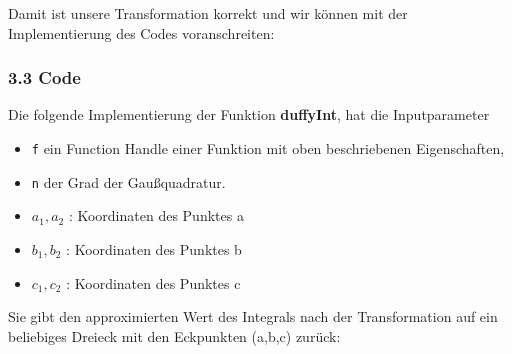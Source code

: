 \documentclass[a4paper,11pt,bibliography=totoc,listof=totoc,headinclude=true,cleardoublepage=empty,oneside]{scrbook}
\newcommand{\code}[1]{\texttt{\color{change}#1}}
\begin{document}
		Damit ist unsere Transformation korrekt und wir können mit der Implementierung des Codes voranschreiten:
	
	\vspace{3mm} 
		
		
			\subsubsection{3.3 Code}
			Die folgende Implementierung der Funktion \textbf{duffyInt}, hat die Inputparameter
			\begin{itemize}
				\item \code{f} ein Function Handle einer Funktion mit oben beschriebenen Eigenschaften,
				\item \code{n} der Grad der Gaußquadratur.
				\item \code{$a_1,a_2$} : Koordinaten des Punktes a
				\item \code{$b_1,b_2$} : Koordinaten des Punktes b
				\item \code{$c_1,c_2$} : Koordinaten des Punktes c
			\end{itemize} 
			Sie gibt den approximierten Wert des Integrals nach der Transformation auf ein beliebiges Dreieck mit den Eckpunkten (a,b,c) zurück: \\
		
		\color{change}
		\lstset{ 
			language=Matlab, 
			showstringspaces=false}
		
		
		
		 
		\begin{lstlisting} 
		
		
		\end{lstlisting}
		
\end{document}
